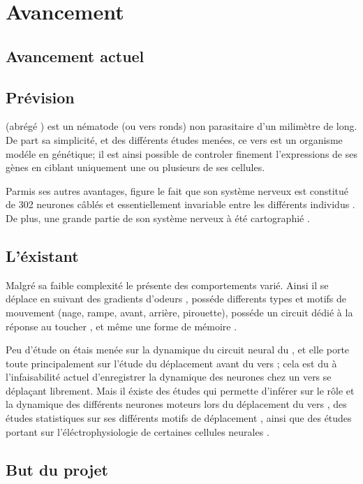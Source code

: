 \chapter{Avancement}

\section{Avancement actuel}
\section{Prévision}

\caeleg{} (abrégé \celeg{}) est un nématode (ou vers ronds) non parasitaire d'un milimètre de long.
De part sa simplicité, et des différents études menées, ce vers est un organisme modéle en génétique;
il est ainsi possible de controler finement l'expressions de ses gènes en ciblant uniquement une ou
plusieurs de ses cellules.

Parmis ses autres avantages, figure le fait que son système nerveux est constitué de 302
neurones câblés et essentiellement invariable entre les différents individus \cite{Boyle2009}.
De plus, une grande partie de son système nerveux à été cartographié
\cite{Durbin1987,Gray2005,Boyle2009,Varshney2011}.


\section{L'éxistant}
Malgré sa faible complexité le \celeg{} présente des comportements varié. Ainsi il se déplace
en suivant des gradients d'odeurs \cite{Ferree1999,Gray2005}, posséde differents types et
motifs de mouvement (nage, rampe, avant, arrière, pirouette), posséde un circuit dédié à la 
réponse au toucher \cite{Chalfie1985}, et même une forme de mémoire \cite{Rankin2005a}.


Peu d'étude on étais menée sur la dynamique du circuit neural du \celeg{}, et elle porte
toute principalement sur l'étude du déplacement avant du vers \cite{Bryden2008,Boyle2009};
cela est du à l'infaisabilité actuel d'enregistrer la dynamique des neurones chez un vers
se déplaçant librement. Mais il éxiste des études qui permette d'inférer sur le rôle et la dynamique
des différents neurones moteurs lors du déplacement du vers \cite{Yanik2006,Chronis2007,Leifer2011},
des études statistiques sur ses différents motifs de déplacement \cite{Gray2005}, ainsi que
des études portant sur l'éléctrophysiologie de certaines cellules neurales \cite{Mellem2008a,Lockery2009}.

\section{But du projet}

